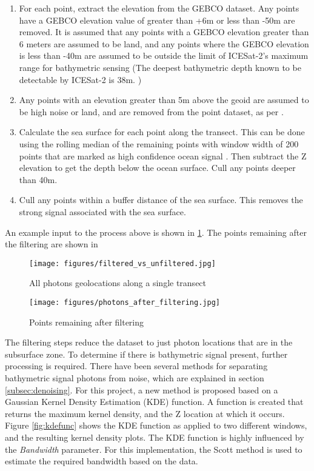 \begin{enumerate}
    \item For each point, extract the elevation from the GEBCO dataset. Any points have a GEBCO elevation value of greater than +6m or less than -50m are removed. It is assumed that any points with a GEBCO elevation greater than 6 meters are assumed to be land, and any points where the GEBCO elevation is less than -40m are assumed to be outside the limit of ICESat-2's maximum range for bathymetric sensing (The deepest bathymetric depth known to be detectable by ICESat-2 is 38m. \parencite{Parrish2019})
    
    \item Any points with an elevation greater than 5m above the geoid are assumed to be high noise or land, and are removed from the point dataset, as per \citeauthor{Ranndal2021}.

    \item Calculate the sea surface for each point along the transect. This can be done using the rolling median of the remaining points with window width of 200 points that are marked as high confidence ocean signal \parencite{Ranndal2021}. Then subtract the Z elevation to get the depth below the ocean surface.  Cull any points deeper than 40m. 
    \item Cull any points within a buffer distance of the sea surface. This removes the strong signal associated with the sea surface.
\end{enumerate}

An example input to the process above is shown in \ref{fig:filtering_results}. The points remaining after the filtering are shown in 

\begin{figure}[h!]
    \centering
    \texttt{[image: figures/filtered\_vs\_unfiltered.jpg]}
    \caption{All photons geolocations along a single transect}
    \label{fig:filtering_results}
\end{figure}

\begin{figure}[h!]
    \centering
    \texttt{[image: figures/photons\_after\_filtering.jpg]}
    \caption{Points remaining after filtering}
    \label{fig:filtered_pts_only}
\end{figure}

The filtering steps reduce the dataset to just photon locations that are in the subsurface zone. To determine if there is bathymetric signal present, further processing is required. There have been several methods for separating bathymetric signal photons from noise, which are explained in section \ref{subsec:denoising}. For this project, a new method is proposed based on a Gaussian Kernel Density Estimation (KDE) function. A function is created that returns the maximum kernel density, and the Z location at which it occurs. Figure \ref{fig:kdefunc} shows the KDE function as applied to two different windows, and the resulting kernel density plots. The KDE function is highly influenced by the \emph{Bandwidth} parameter. For this implementation, the Scott method \parencite{Scott2015} is used to estimate the required bandwidth based on the data. 

